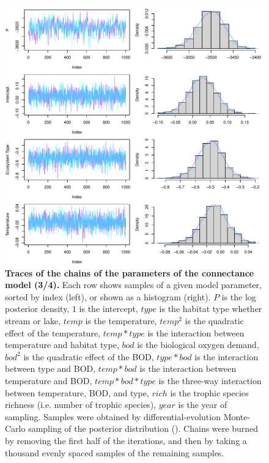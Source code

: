 \documentclass[11pt, oneside]{article}
\begin{document}
\begin{figure}[H]
\begin{center}
\includegraphics[page=3, width=1\linewidth]{scripts/b0_6_3/out_con/fig_tracePlot_beta.pdf}
\caption{
    \textbf{Traces of the chains of the parameters of the connectance model (3/4).}
    Each row shows samples of a given model parameter, sorted by index (left), or shown as a histogram (right).
    $P$ is the log posterior density, $1$ is the intercept, $type$ is the habitat type whether stream or lake, $temp$ is the temperature, $temp^2$ is the quadratic effect of the temperature, $temp * type$ is the interaction between temperature and habitat type, $bod$ is the biological oxygen demand, $bod^2$ is the quadratic effect of the BOD, $type * bod$ is the interaction between type and BOD, $temp * bod$ is the interaction between temperature and BOD, $temp * bod * type$ is the three-way interaction between temperature, BOD, and type, $rich$ is the trophic species richness (i.e. number of trophic species), $year$ is the year of sampling.
    Samples were obtained by differential-evolution Monte-Carlo sampling of the posterior distribution (\cite{TerBraak2006}).
    Chains were burned by removing the first half of the iterations, and then by taking a thousand evenly spaced samples of the remaining samples.
}
\end{center}
\end{figure}
\end{document}

